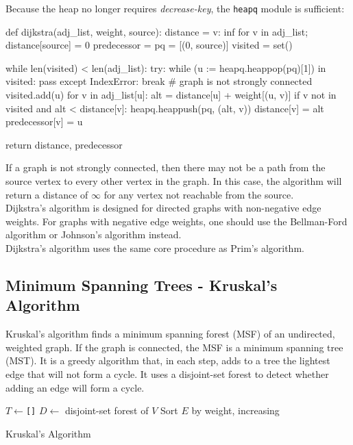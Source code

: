 \documentclass[12pt, titlepage]{article}
\begin{document}
Because the heap no longer requires \textit{decrease-key}, the \texttt{heapq} module is sufficient: \medskip

\begin{python}
def dijkstra(adj_list, weight, source):
    distance = {v: inf for v in adj_list}; distance[source] = 0
    predecessor = {}
    pq = [(0, source)]
    visited = set()

    while len(visited) < len(adj_list):
        try:
            while (u := heapq.heappop(pq)[1]) in visited: pass
        except IndexError:
            break  # graph is not strongly connected
        visited.add(u)
        for v in adj_list[u]:
            alt = distance[u] + weight[(u, v)]
            if v not in visited and alt < distance[v]:
                heapq.heappush(pq, (alt, v))
                distance[v] = alt
                predecessor[v] = u

    return distance, predecessor
\end{python}

If a graph is not strongly connected, then there may not be a path from the source vertex to every other vertex in the graph. In this case, the algorithm will return a distance of $\infty$ for any vertex not reachable from the source. \\

Dijkstra's algorithm is designed for directed graphs with non-negative edge weights. For graphs with negative edge weights, one should use the Bellman-Ford algorithm or Johnson's algorithm instead. \\

Dijkstra's algorithm uses the same core procedure as Prim's algorithm.

\subsection{Minimum Spanning Trees - Kruskal's Algorithm} \label{kruskal}

Kruskal's algorithm finds a minimum spanning forest (MSF) of an undirected, weighted graph. If the graph is connected, the MSF is a minimum spanning tree (MST). It is a greedy algorithm that, in each step, adds to a tree the lightest edge that will not form a cycle. It uses a disjoint-set forest to detect whether adding an edge will form a cycle. \\

\begin{algorithm}[H]
  \SetAlgoLined
  \DontPrintSemicolon
  $T \longleftarrow$\hspace{0.5mm}\texttt{[]}\;
  $D \longleftarrow$\hspace{0.5mm} disjoint-set forest of $V$\;
  Sort $E$ by weight, increasing\;
  \;
  \caption{Kruskal's Algorithm}
\end{algorithm} \medskip
\end{document}
